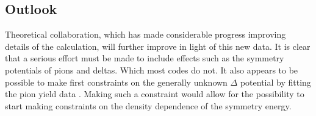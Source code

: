 \subsection{Outlook}
Theoretical collaboration, which has made considerable progress improving details of the calculation, will further improve in light of this new data. It is clear that a serious effort must be made to include effects such as the symmetry potentials of pions and deltas. Which most codes do not. It also appears to be possible to make first constraints on the generally unknown $\Delta$ potential by fitting the pion yield data \cite{cozmaPC}. Making such a constraint would allow for the possibility to start making constraints on the density dependence of the symmetry energy. 

